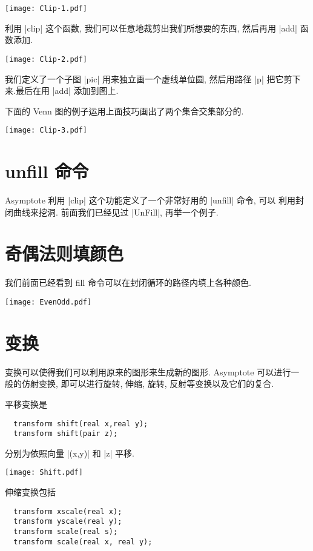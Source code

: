 \documentclass{ctexbook}
\begin{document}
\begin{center}\texttt{[image: Clip-1.pdf]}\end{center}%


利用 |clip| 这个函数, 我们可以任意地裁剪出我们所想要的东西, 然后再用
|add| 函数添加. 
\begin{center}\texttt{[image: Clip-2.pdf]}\end{center}%


我们定义了一个子图 |pic| 用来独立画一个虚线单位圆, 然后用路径
|p| 把它剪下来.最后在用 |add| 添加到图上.

下面的 Venn 图的例子运用上面技巧画出了两个集合交集部分的.
\begin{center}\texttt{[image: Clip-3.pdf]}\end{center}%


\section{unfill 命令}
Asymptote 利用 |clip| 这个功能定义了一个非常好用的 |unfill| 命令, 可以
利用封闭曲线来挖洞. 前面我们已经见过 |UnFill|, 再举一个例子.

\section{奇偶法则填颜色}

我们前面已经看到 {fill} 命令可以在封闭循环的路径内填上各种颜色.
\begin{center}\texttt{[image: EvenOdd.pdf]}\end{center}%

\section{变换}
变换可以使得我们可以利用原来的图形来生成新的图形. Asymptote 可以进行一
般的仿射变换, 即可以进行旋转, 伸缩, 旋转, 反射等变换以及它们的复合. 

平移变换是
\begin{lstlisting}
  transform shift(real x,real y);
  transform shift(pair z);
\end{lstlisting}
分别为依照向量 |(x,y)| 和 |z| 平移.

\begin{center}\texttt{[image: Shift.pdf]}\end{center}%


伸缩变换包括
\begin{lstlisting}
  transform xscale(real x); 
  transform yscale(real y); 
  transform scale(real s);  
  transform scale(real x, real y); 
\end{lstlisting}
\end{document}
